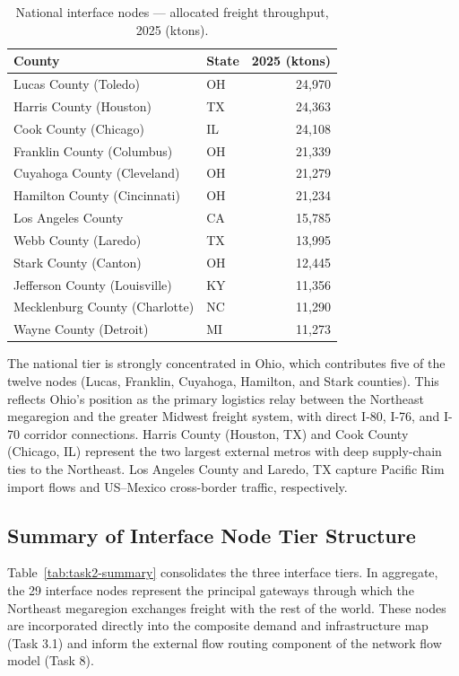 \begin{table}[htbp]
\centering
\caption{National interface nodes — allocated freight throughput, 2025 (ktons).}
\begin{tabular}{llr}
\toprule
County & State & 2025 (ktons) \\
\midrule
Lucas County (Toledo)          & OH & 24{,}970 \\
Harris County (Houston)        & TX & 24{,}363 \\
Cook County (Chicago)          & IL & 24{,}108 \\
Franklin County (Columbus)     & OH & 21{,}339 \\
Cuyahoga County (Cleveland)    & OH & 21{,}279 \\
Hamilton County (Cincinnati)   & OH & 21{,}234 \\
Los Angeles County             & CA & 15{,}785 \\
Webb County (Laredo)           & TX & 13{,}995 \\
Stark County (Canton)          & OH & 12{,}445 \\
Jefferson County (Louisville)  & KY & 11{,}356 \\
Mecklenburg County (Charlotte) & NC & 11{,}290 \\
Wayne County (Detroit)         & MI & 11{,}273 \\
\bottomrule
\end{tabular}
\label{tab:task2-national}
\end{table}

The national tier is strongly concentrated in Ohio, which contributes five of the twelve
nodes (Lucas, Franklin, Cuyahoga, Hamilton, and Stark counties). This reflects Ohio's
position as the primary logistics relay between the Northeast megaregion and the greater
Midwest freight system, with direct I-80, I-76, and I-70 corridor connections. Harris
County (Houston, TX) and Cook County (Chicago, IL) represent the two largest external
metros with deep supply-chain ties to the Northeast. Los Angeles County and Laredo, TX
capture Pacific Rim import flows and US--Mexico cross-border traffic, respectively.

\subsection{Summary of Interface Node Tier Structure}

Table~\ref{tab:task2-summary} consolidates the three interface tiers. In aggregate,
the 29 interface nodes represent the principal gateways through which the Northeast
megaregion exchanges freight with the rest of the world. These nodes are incorporated
directly into the composite demand and infrastructure map (Task 3.1) and inform the
external flow routing component of the network flow model (Task 8).

